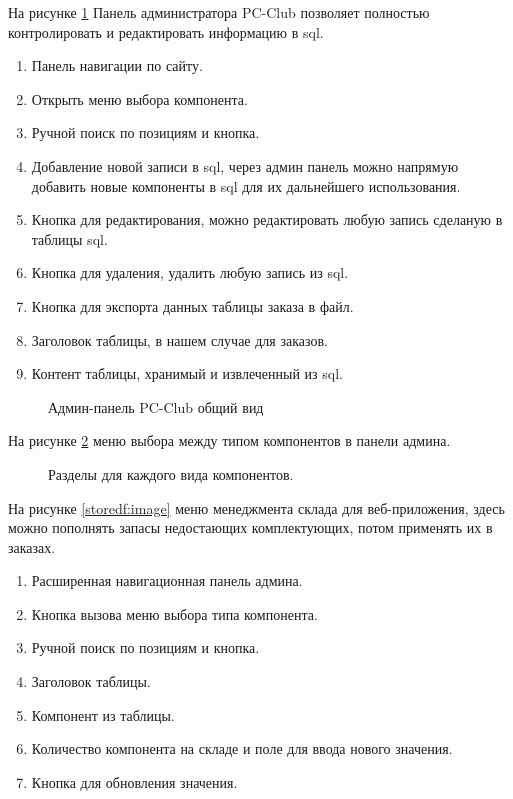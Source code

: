 На рисунке \ref{adminall:image} Панель администратора PC-Club позволяет полностью контролировать и редактировать информацию в sql.

\begin{enumerate}
	\item Панель навигации по сайту.
	\item Открыть меню выбора компонента.
	\item Ручной поиск по позициям и кнопка.
	\item Добавление новой записи в sql, через админ панель можно напрямую добавить новые компоненты в sql для их дальнейшего использования.
	\item Кнопка для редактирования, можно редактировать любую запись сделаную в таблицы sql.
	\item Кнопка для удаления, удалить любую запись из sql.
	\item Кнопка для экспорта данных таблицы заказа в файл.
	\item Заголовок таблицы, в нашем случае для заказов.
	\item Контент таблицы, хранимый и извлеченный из sql.
\end{enumerate}

\begin{figure}[ht]
\caption{Админ-панель PC-Club общий вид}
\label{adminall:image}
\end{figure}

На рисунке \ref{razdeli:image} меню выбора между типом компонентов в панели админа.

\begin{figure}[htbp]
\caption{Разделы для каждого вида компонентов.}
\label{razdeli:image}
\end{figure}

На рисунке \ref{storedf:image} меню менеджмента склада для веб-приложения, здесь можно пополнять запасы недостающих комплектующих, потом применять их в заказах.

\begin{enumerate}
	\item Расширенная навигационная панель админа.
	\item Кнопка вызова меню выбора типа компонента.
	\item Ручной поиск по позициям и кнопка.
	\item Заголовок таблицы.
	\item Компонент из таблицы.
	\item Количество компонента на складе и поле для ввода нового значения.
	\item Кнопка для обновления значения.
\end{enumerate}

